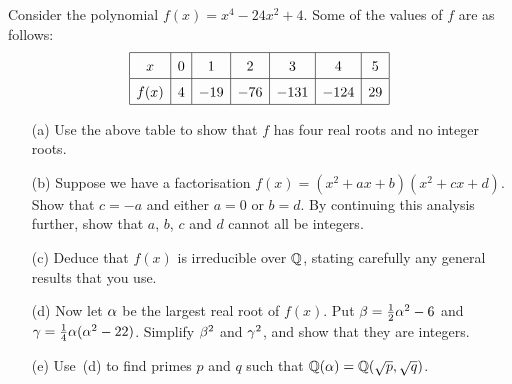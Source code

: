 \documentclass[a4paper]{article}
\begin{document}
\begin{problem}%
 Consider the polynomial $f(x)=x^4-24x^2+4$.  Some of the values of
 $f$ are as follows:  
 \[ \renewcommand{\arraystretch}{1.5}
    \begin{array}{|c|c|c|c|c|c|c|}
     \hline
     x    & 0 & 1 & 2 & 3 & 4 & 5 \\ \hline
     f(x) & 4 & -19 & -76 & -131 & -124 & 29 \\ \hline 
    \end{array}
 \]
 \begin{itemize}
  \item[(a)] Use the above table to show that $f$ has four real roots
   and no integer roots. 
  \item[(b)] Suppose we have a factorisation
   $f(x)=(x^2+ax+b)(x^2+cx+d)$.  Show that $c=-a$ and either $a=0$ or
   $b=d$.  By continuing this analysis further, show that $a$, $b$,
   $c$ and $d$ cannot all be integers. 
  \item[(c)] Deduce that $f(x)$ is irreducible over ${\mathbb{Q}}$, stating
   carefully any general results that you use. 
  \item[(d)] Now let $\alpha$ be the largest real root of $f(x)$.  Put
   $\beta={\textstyle\frac{1}{2}}\alpha^2-6$ and $\gamma=\tfrac{1}{4}\alpha(\alpha^2-22)$.  Simplify
   $\beta^2$ and $\gamma^2$, and show that they are integers. 
  \item[(e)] Use~(d) to find primes $p$ and $q$ such that
   ${\mathbb{Q}}(\alpha)={\mathbb{Q}}(\sqrt{p},\sqrt{q})$. 
 \end{itemize}
\end{problem}
\end{document}
